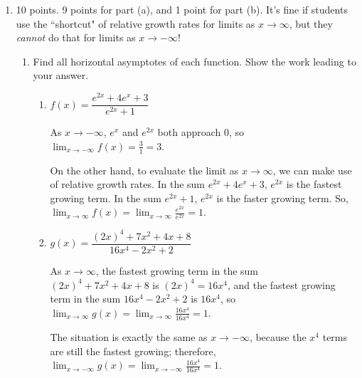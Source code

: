 \documentclass{article}
\begin{document}
\begin{enumerate}
\begin{enumerate}
  \end{enumerate}

\item

\begin{grading}
10 points. 9 points for part (a), and 1 point for part (b). It's fine if students use the ``shortcut" of relative growth rates for limits as $x\to\infty$, but they \textit{cannot} do that for limits as $x\to -\infty$!
\end{grading}

\begin{enumerate}
  \item Find all horizontal asymptotes of each
    function. Show the work leading to your answer.

    \begin{enumerate}
    \item
      \begin{problem}[\vfill]
        $f(x) = \dfrac{e^{2x} + 4 e^x + 3}{e^{2x} + 1}$
      \end{problem}

      \begin{solution}
        As $x \to -\infty$, $e^x$ and $e^{2x}$ both approach 0, so
        $\boxed{ \lim_{x \to -\infty} f(x) = \frac{3}{1} = 3}$.

        On the other hand, to evaluate the limit as $x \to \infty$, we can
        make use of relative growth rates.  In the sum $e^{2x} + 4 e^x +
        3$, $e^{2x}$ is the fastest growing term.  In the sum $e^{2x} +
        1$, $e^{2x}$ is the faster growing term.  So, $\boxed{\lim_{x \to
            \infty} f(x) = \lim_{x \to \infty} \frac{e^{2x}}{e^{2x}} =
          1}$.         
      \end{solution}

    \item
      \begin{problem}[\vfill]
        $g(x) = \dfrac{(2x)^4 + 7x^2 + 4x + 8}{16 x^4 - 2x^2 + 2}$
      \end{problem}

      \begin{solution} 
        As $x \to \infty$, the fastest growing term in the sum $(2x)^4 +
        7x^2 + 4x + 8$ is $(2x)^4 = 16 x^4$, and the fastest growing term
        in the sum $16 x^4 - 2x^2 + 2$ is $16 x^4$, so $\boxed{\lim_{x \to
            \infty} g(x) = \lim_{x \to \infty} \frac{16 x^4}{16x^4} = 1}$.

        The situation is exactly the same as $x \to -\infty$, because the
        $x^4$ terms are still the fastest growing; therefore, $\boxed{
          \lim_{x \to -\infty} g(x) = \lim_{x \to -\infty} \frac{16
            x^4}{16 x^4} = 1}$.
      \end{solution}


\end{enumerate}
\end{enumerate}
\end{enumerate}
\end{document}
